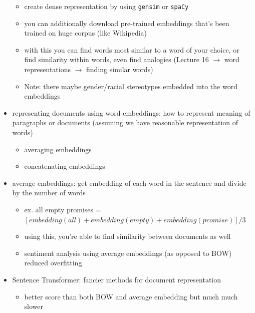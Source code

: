 \documentclass[10.5pt,a4paper, fleqn, dvipsnames]{article}
\begin{document}
\begin{itemize}
\begin{itemize}
        \item create dense representation by using \lstinline{gensim} or \lstinline{spaCy}
        \item you can additionally download pre-trained embeddings that's been trained on huge corpus (like Wikipedia)
        \item with this you can find words most similar to a word of your choice, or find similarity within words, even find analogies (Lecture 16 $\rightarrow$ word representations $\rightarrow$ finding similar words)
        \item Note: there maybe gender/racial stereotypes embedded into the word embeddings
    \end{itemize}
    \item representing documents using word embeddings: how to represent meaning of paragraphs or documents (assuming we have reasonable representation of words)
    \begin{itemize}
        \item averaging embeddings
        \item concatenating embeddings
    \end{itemize}
    \item average embeddings: get embedding of each word in the sentence and divide by the number of words
    \begin{itemize}
        \item ex. all empty promises = $[embedding(all) + embedding(empty) + embedding(promise)]/3$
        \item using this, you're able to find similarity between documents as well 
        \item sentiment analysis using average embeddings (as opposed to BOW) reduced overfitting
    \end{itemize}
    \item Sentence Transformer: fancier methods for document representation 
    \begin{itemize}
        \item better score than both BOW and average embedding but much much slower 
    \end{itemize}
\end{itemize}
\end{document}

